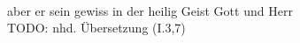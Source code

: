 \begin{exe}
\ex \label{ex:I1431} \gll \object{* }             \\
{} {aber} {er} {sein} {gewiss} {in} {der} {heilig} {Geist} {Gott} {und} {Herr} {}\\
\glt TODO: nhd. Übersetzung (I.3,7)
\end{exe}
